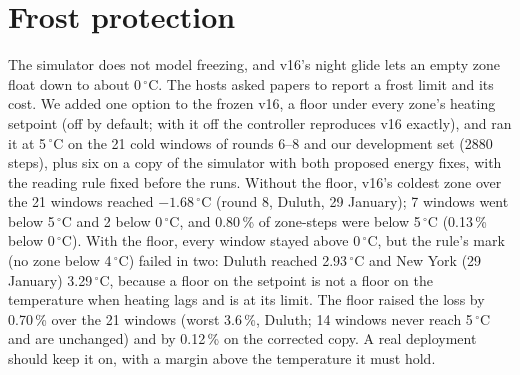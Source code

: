 \documentclass{article}
\begin{document}
\section{Frost protection}\label{app:frost}
The simulator does not model freezing, and v16's night glide lets an empty zone float down to about 0\,$^\circ$C. The
hosts asked papers to report a frost limit and its cost. We added one option to the frozen v16, a floor under every
zone's heating setpoint (off by default; with it off the controller reproduces v16 exactly), and ran it at 5\,$^\circ$C
on the 21 cold windows of rounds 6--8 and our development set (2880 steps), plus six on a copy of the simulator with
both proposed energy fixes, with the reading rule fixed before the runs. Without the floor, v16's coldest zone over the
21 windows reached $-1.68\,^\circ$C (round 8, Duluth, 29 January); 7 windows went below 5\,$^\circ$C and 2 below
0\,$^\circ$C, and 0.80\,\% of zone-steps were below 5\,$^\circ$C (0.13\,\% below 0\,$^\circ$C). With the floor, every
window stayed above 0\,$^\circ$C, but the rule's mark (no zone below 4\,$^\circ$C) failed in two: Duluth reached
2.93\,$^\circ$C and New York (29 January) 3.29\,$^\circ$C, because a floor on the setpoint is not a floor on the
temperature when heating lags and is at its limit. The floor raised the loss by 0.70\,\% over the 21 windows (worst
3.6\,\%, Duluth; 14 windows never reach 5\,$^\circ$C and are unchanged) and by 0.12\,\% on the corrected copy. A real
deployment should keep it on, with a margin above the temperature it must hold.

\end{document}
